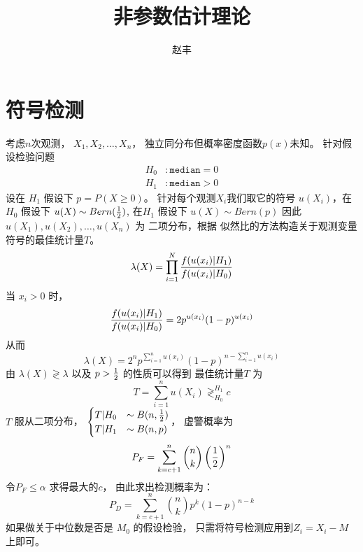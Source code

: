 \documentclass{ctexart}
\numberwithin{equation}{section}
\begin{document}
\title{非参数估计理论}
\author{赵丰}
\maketitle
\section{符号检测}
考虑$n$次观测， $X_1, X_2, \dots, X_n$， 独立同分布但概率密度函数$p(x)$未知。 针对假设检验问题
\begin{align*}
H_0 &: \mathtt{median} = 0\\
H_1 & : \mathtt{median} >0 
\end{align*}
设在 $H_1$ 假设下 $ p = P(X \geq 0)$。
针对每个观测$ X_i $我们取它的符号 $ u(X_i) $，在$H_0$ 假设下 $u(X) \sim Bern({1 \over 2}) $, 在$H_1$ 假设下 $u(X) \sim Bern(p) $
因此$u(X_1), u(X_2), \dots, u(X_n) $ 为 二项分布，根据 
似然比的方法构造关于观测变量符号的最佳统计量$T$。
$$
\lambda(X) = \prod_{ i = 1}^N { f( u(x_i) | H_1) \over f( u(x_i) | H_0)}
$$
当 $ x_i > 0 $ 时，
\begin{align*}
{ f( u(x_i) | H_1) \over f( u(x_i) | H_0) } = 2 p^{u(x_i)} (1-p)^{u(x_i)}
\end{align*}
从而 
$$ 
\lambda(X) = 2^n p^{\sum_{i=1}^n u(x_i)} (1-p)^{ n - \sum_{i=1}^n u(x_i) } 
$$
由 $ \lambda(X) \gtrless \lambda $ 以及 $ p > { 1 \over 2} $ 的性质可以得到
最佳统计量$T$ 为
$$
T = \sum_{ i = 1 }^n u(X_i) \mathop{\gtrless}_{H_0}^{H_1} c
$$
$T$ 服从二项分布， $
\begin{cases} T | H_0 & \sim B(n, { 1 \over 2 } ) \\
T | H_1 & \sim B(n, p) 
\end{cases}
$， 虚警概率为 
$$
P_F = \sum_{ k = c+1}^n \binom{n}{k} \left({1 \over 2}\right)^n 
$$
令$P_F \leq \alpha $ 求得最大的$c$， 由此求出检测概率为：
$$
P_D = \sum_{ k = c+1}^n \binom{n}{k} p^k (1-p)^{n-k}
$$
如果做关于中位数是否是 $M_0 $ 的假设检验， 只需将符号检测应用到$Z_i = X_i - M$ 上即可。
\end{document}
